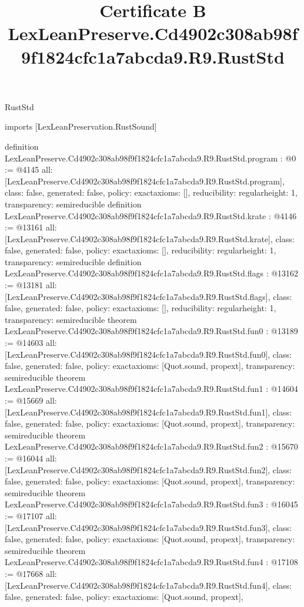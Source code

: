 \begin{lexlean}{RustStd}
\title{Certificate B LexLeanPreserve.Cd4902c308ab98f9f1824cfc1a7abcda9.R9.RustStd}
\begin{coremodule}
imports [LexLeanPreservation.RustSound]

definition LexLeanPreserve.Cd4902c308ab98f9f1824cfc1a7abcda9.R9.RustStd.program : @0 := @4145 {
  all: [LexLeanPreserve.Cd4902c308ab98f9f1824cfc1a7abcda9.R9.RustStd.program],
  class: false,
  generated: false,
  policy: exact{axioms: []},
  reducibility: regular{height: 1},
  transparency: semireducible
}
definition LexLeanPreserve.Cd4902c308ab98f9f1824cfc1a7abcda9.R9.RustStd.krate : @4146 := @13161 {
  all: [LexLeanPreserve.Cd4902c308ab98f9f1824cfc1a7abcda9.R9.RustStd.krate],
  class: false,
  generated: false,
  policy: exact{axioms: []},
  reducibility: regular{height: 1},
  transparency: semireducible
}
definition LexLeanPreserve.Cd4902c308ab98f9f1824cfc1a7abcda9.R9.RustStd.flags : @13162 := @13181 {
  all: [LexLeanPreserve.Cd4902c308ab98f9f1824cfc1a7abcda9.R9.RustStd.flags],
  class: false,
  generated: false,
  policy: exact{axioms: []},
  reducibility: regular{height: 1},
  transparency: semireducible
}
theorem LexLeanPreserve.Cd4902c308ab98f9f1824cfc1a7abcda9.R9.RustStd.fun0 : @13189 := @14603 {
  all: [LexLeanPreserve.Cd4902c308ab98f9f1824cfc1a7abcda9.R9.RustStd.fun0],
  class: false,
  generated: false,
  policy: exact{axioms: [Quot.sound, propext]},
  transparency: semireducible
}
theorem LexLeanPreserve.Cd4902c308ab98f9f1824cfc1a7abcda9.R9.RustStd.fun1 : @14604 := @15669 {
  all: [LexLeanPreserve.Cd4902c308ab98f9f1824cfc1a7abcda9.R9.RustStd.fun1],
  class: false,
  generated: false,
  policy: exact{axioms: [Quot.sound, propext]},
  transparency: semireducible
}
theorem LexLeanPreserve.Cd4902c308ab98f9f1824cfc1a7abcda9.R9.RustStd.fun2 : @15670 := @16044 {
  all: [LexLeanPreserve.Cd4902c308ab98f9f1824cfc1a7abcda9.R9.RustStd.fun2],
  class: false,
  generated: false,
  policy: exact{axioms: [Quot.sound, propext]},
  transparency: semireducible
}
theorem LexLeanPreserve.Cd4902c308ab98f9f1824cfc1a7abcda9.R9.RustStd.fun3 : @16045 := @17107 {
  all: [LexLeanPreserve.Cd4902c308ab98f9f1824cfc1a7abcda9.R9.RustStd.fun3],
  class: false,
  generated: false,
  policy: exact{axioms: [Quot.sound, propext]},
  transparency: semireducible
}
theorem LexLeanPreserve.Cd4902c308ab98f9f1824cfc1a7abcda9.R9.RustStd.fun4 : @17108 := @17668 {
  all: [LexLeanPreserve.Cd4902c308ab98f9f1824cfc1a7abcda9.R9.RustStd.fun4],
  class: false,
  generated: false,
  policy: exact{axioms: [Quot.sound, propext]},
}
\end{coremodule}
\end{lexlean}
